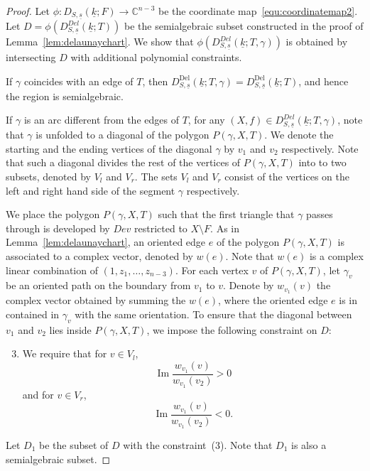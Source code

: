 \documentclass{compositio}
\numberwithin{equation}{section}
\numberwithin{figure}{section}
\theoremstyle{definition}
\theoremstyle{plain}
\begin{document}
{\begin{proof}
    Let $\phi:D_{S,\underline{s}}(\underline{k};F)\to \mathbb{C}^{n-3}$ be the coordinate map~\eqref{equ:coordinatemap2}. Let $D=\phi(D_{S,\underline{s}}^{Del}(\underline{k};T))$ be the semialgebraic subset constructed in the proof of Lemma~\ref{lem:delaunaychart}. We show that $\phi(D_{S,\underline{s}}^{Del}(\underline{k};T,\gamma))$ is obtained by intersecting $D$ with additional polynomial constraints.

    If $\gamma$ coincides with an edge of $T$, then $D_{S,\underline{s}}^{\mathrm{Del}}(\underline{k};T, \gamma) = D_{S,\underline{s}}^{\mathrm{Del}}(\underline{k};T)$, and hence the region is semialgebraic.

    If $\gamma$ is an arc different from the edges of $T$, for any $(X,f)\in D_{S,\underline{s}}^{Del}(\underline{k};T, \gamma)$, note that $\gamma$ is unfolded to a diagonal of the polygon $P(\gamma, X, T)$. We denote the starting and the ending vertices of the diagonal $\gamma$ by $v_1$ and $v_2$ respectively. Note that such a diagonal divides the rest of the vertices of $P(\gamma, X, T)$ into to two subsets, denoted by $V_l$ and $V_r$. The sets $V_l$ and $V_r$ consist of the vertices on the left and right hand side of the segment $\gamma$ respectively. 

    We place the polygon $P(\gamma, X, T)$ such that the first triangle that $\gamma$ passes through is developed by $Dev$ restricted to $X\setminus F$. 
    As in Lemma~\ref{lem:delaunaychart}, an oriented edge $e$ of the polygon $P(\gamma, X, T)$ is associated to a complex vector, denoted by $w(e)$. Note that $w(e)$ is a complex linear combination of $(1, z_1,\ldots,z_{n-3})$. For each vertex $v$ of $P(\gamma,X,T)$, let $\gamma_v$ be an oriented path on the boundary from $v_1$ to $v$. Denote by $w_{v_1}(v)$ the complex vector obtained by summing the $w(e)$, where the oriented edge $e$ is in contained in $\gamma_v$ with the same orientation. To ensure that the diagonal between $v_1$ and $v_2$ lies inside $P(\gamma, X, T)$, we impose the following constraint on $D$:
    \begin{enumerate}
        \setcounter{enumi}{2}
        \item We require that for $v\in V_l$,
        $$
        \operatorname{Im}\frac{w_{v_1}(v)}{w_{v_1}(v_2)}>0
        $$
        and for $v\in V_r$,
        $$        
        \operatorname{Im}\frac{w_{v_1}(v)}{w_{v_1}(v_2)}<0.
        $$
    \end{enumerate}
    Let $D_1$ be the subset of $D$ with the constraint~(3). Note that $D_1$ is also a semialgebraic subset.


\end{proof}}
\end{document}
